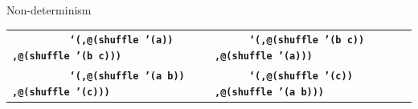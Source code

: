 \documentclass{beamer}
\begin{document}
\begin{frame}{Non-determinism}
  \tiny
  \begin{tabularx}{\textwidth}{ X X }
    \texttt{\ \newline
      \ \newline
      \ \newline
      \ \newline
      \ \newline
      \hphantom{\_\_\_\_\_}\textbf{`(,@(shuffle '(a))\newline
      \hphantom{\_\_\_\_\_\_\_},@(shuffle '(b c)))}\newline
      \ 
    }
    &
    \texttt{\ \newline
      \ \newline
      \ \newline
      \hphantom{\_\_\_\_\_\_}\textbf{`(,@(shuffle '(b c))\newline
      \hphantom{\_\_\_\_\_\_\_\_},@(shuffle '(a)))}\newline
      \ \newline
      \ \newline
      \ 
    }

    \\

    \texttt{\ \newline
      \ \newline
      \ \newline
      \ \newline
      \ \newline
      \hphantom{\_\_\_\_\_}\textbf{`(,@(shuffle '(a b))\newline
      \hphantom{\_\_\_\_\_\_\_},@(shuffle '(c)))}\newline
      \ 
    }
    &
    \texttt{\ \newline
      \ \newline
      \ \newline
      \hphantom{\_\_\_\_\_\_}\textbf{`(,@(shuffle '(c))\newline
      \hphantom{\_\_\_\_\_\_\_\_},@(shuffle '(a b)))}\newline
      \ \newline
      \ \newline
      \ 
    }

  \end{tabularx}
\end{frame}
\end{document}
